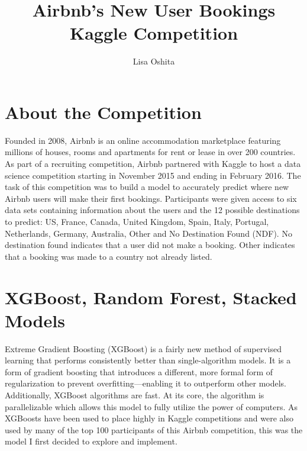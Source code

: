 \documentclass{article}
\title{Airbnb's New User Bookings Kaggle Competition}
\author{Lisa Oshita}
\begin{document}


\maketitle

\section{About the Competition}


Founded in 2008, Airbnb is an online accommodation marketplace featuring millions of houses,
rooms and apartments for rent or lease in over 200 countries. As part of a recruiting competition,
Airbnb partnered with Kaggle to host a data science competition starting in November 2015 and ending
in February 2016. The task of this competition was to build a model to accurately predict where new
Airbnb users will make their first bookings. Participants were given access to six data sets containing
information about the users and the 12 possible destinations to predict: US, France, Canada, United Kingdom, 
Spain, Italy, Portugal, Netherlands, Germany, Australia, Other and No Destination Found (NDF). No destination 
found indicates that a user did not make a booking. Other indicates that a booking was made to a 
country not already listed. 


\section{XGBoost, Random Forest, Stacked Models}

Extreme Gradient Boosting (XGBoost) is a fairly new method of supervised learning that performs consistently 
better than single-algorithm models. It is a form of gradient boosting that introduces a different, more 
formal form of regularization to prevent overfitting---enabling it to outperform other models. Additionally, 
XGBoost algorithms are fast. At its core, the algorithm is parallelizable which allows this model to fully 
utilize the power of computers. As XGBoosts have been used to place highly in Kaggle competitions and were 
also used by many of the top 100 participants of this Airbnb competition, this was the model I first decided 
to explore and implement. 
\end{document}
